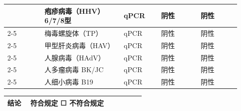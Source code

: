 \documentclass[UTF8,10pt,a4paper,fontset=fandol]{ctexart}
\newcommand{\fieldvalue}[1]{#1}
\newcommand{\checkboxfield}[1]{\ifstrequal{#1}{checked}{☑}{\ifstrequal{#1}{unclear}{?}{☐}}}
\begin{document}
\begin{tabular}{|p{0.15\linewidth}|p{0.32\linewidth}|p{0.15\linewidth}|p{0.16\linewidth}|p{0.16\linewidth}|}
& %
\fieldvalue{疱疹病毒（HHV）6/7/8型}
& %
\fieldvalue{qPCR}
& %
\fieldvalue{阴性}
& %
\fieldvalue{阴性}
\\ \cline{2-5}
& %
\fieldvalue{梅毒螺旋体（TP）}
& %
\fieldvalue{qPCR}
& %
\fieldvalue{阴性}
& %
\fieldvalue{阴性}
\\ \cline{2-5}
& %
\fieldvalue{甲型肝炎病毒（HAV）}
& %
\fieldvalue{qPCR}
& %
\fieldvalue{阴性}
& %
\fieldvalue{阴性}
\\ \cline{2-5}
& %
\fieldvalue{人腺病毒（HAdV）}
& %
\fieldvalue{qPCR}
& %
\fieldvalue{阴性}
& %
\fieldvalue{阴性}
\\ \cline{2-5}
& %
\fieldvalue{人多瘤病毒 BK/JC}
& %
\fieldvalue{qPCR}
& %
\fieldvalue{阴性}
& %
\fieldvalue{阴性}
\\ \cline{2-5}
& %
\fieldvalue{人细小病毒 B19}
& %
\fieldvalue{qPCR}
& %
\fieldvalue{阴性}
& %
\fieldvalue{阴性}
\\ \hline
\end{tabular}

\begin{tabular}{|p{0.15\linewidth}|p{0.75\linewidth}|}
\hline
结论 &
\fieldvalue{符合规定}
\quad
\fieldvalue{\checkboxfield{unchecked}} 不符合规定
\\ \hline
\end{tabular}
\end{document}
